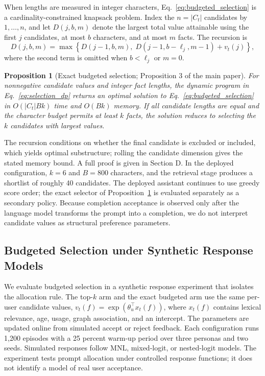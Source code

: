 \documentclass[letterpaper]{article} %
\newtheorem{proposition}{Proposition}
\begin{document}
When lengths are measured in integer characters, Eq.~\eqref{eq:budgeted_selection} is a cardinality-constrained knapsack problem. Index the $n=|C_t|$ candidates by $1,\ldots,n$, and let $D(j,b,m)$ denote the largest total value attainable using the first $j$ candidates, at most $b$ characters, and at most $m$ facts. The recursion is
\begin{equation}
D(j,b,m)=\max\left\{D(j-1,b,m),\;D(j-1,b-\ell_j,m-1)+v_t(j)\right\},
\label{eq:selection_dp}
\end{equation}
where the second term is omitted when $b<\ell_j$ or $m=0$.

\setcounter{proposition}{2}
\begin{proposition}[Exact budgeted selection; Proposition 3 of the main paper]
\label{prop:budgeted_selection}
For nonnegative candidate values and integer fact lengths, the dynamic program in Eq.~\eqref{eq:selection_dp} returns an optimal solution to Eq.~\eqref{eq:budgeted_selection} in $O(|C_t|Bk)$ time and $O(Bk)$ memory. If all candidate lengths are equal and the character budget permits at least $k$ facts, the solution reduces to selecting the $k$ candidates with largest values.
\end{proposition}

The recursion conditions on whether the final candidate is excluded or included, which yields optimal substructure; rolling the candidate dimension gives the stated memory bound. A full proof is given in Section D. In the deployed configuration, $k=6$ and $B=800$ characters, and the retrieval stage produces a shortlist of roughly 40 candidates. The deployed assistant continues to use greedy score order; the exact selector of Proposition~\ref{prop:budgeted_selection} is evaluated separately as a secondary policy. Because completion acceptance is observed only after the language model transforms the prompt into a completion, we do not interpret candidate values as structural preference parameters.

\subsection{Budgeted Selection under Synthetic Response Models}

We evaluate budgeted selection in a synthetic response experiment that isolates the allocation rule. The top-$k$ arm and the exact budgeted arm use the same per-user candidate values, $v_t(f)=\exp(\theta_u^{\top}x_t(f))$, where $x_t(f)$ contains lexical relevance, age, usage, graph association, and an intercept. The parameters are updated online from simulated accept or reject feedback. Each configuration runs 1{,}200 episodes with a 25 percent warm-up period over three personas and two seeds. Simulated responses follow MNL, mixed-logit, or nested-logit models. The experiment tests prompt allocation under controlled response functions; it does not identify a model of real user acceptance.
\end{document}
